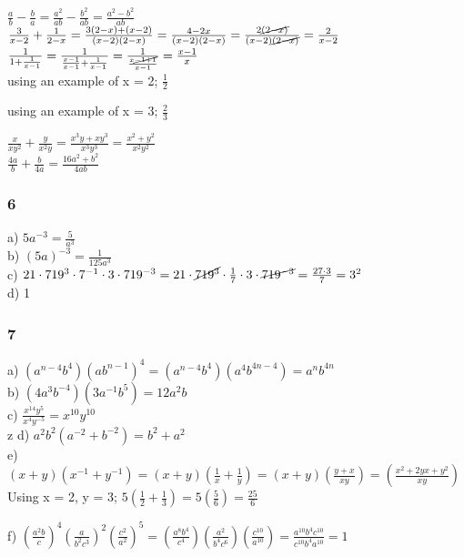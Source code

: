 \documentclass[]{report}
\begin{document}
$ \frac{a}{b} - \frac{b}{a} = \frac{a^2}{ab} - \frac{b^2}{ab} = \frac{a^2-b^2}{ab} $\\
$\frac{3}{x - 2}  + \frac{1}{2-x} = \frac{3(2-x) + (x-2)}{(x-2)(2-x)} = \frac{4 - 2x}{(x-2)(2-x)} =\frac{2\cancel{(2 - x)}}{(x-2)\cancel{(2-x)}} = \frac{2}{x-2}$\\


$\frac{1}{1 + \frac{1}{x-1}} = \frac{1}{\frac{x-1}{x-1} + \frac{1}{x-1}} = \frac{1}{\frac{x\cancel{-1+1}}{x-1}} = \frac{x-1}{x}$ \\

using an example of x = 2;
$\frac{1}{2} $ 

using an example of x = 3;
$\frac{2}{3} $ 



$\frac{x}{xy^2} + \frac{y}{x^2y} = \frac{x^3y + xy^3}{x^3y^3} = \frac{x^2 + y^2}{x^2y^2}$ \\
$\frac{4a}{b} + \frac{b}{4a} = \frac{16a^2 + b^2}{4ab}$

\subsubsection{6}

a) $5a^{-3}  =  \frac{5}{a^3}$ \\
b) $(5a)^{-3} = \frac{1}{125a^3}$ \\
c) $21 \cdot 719^3 \cdot 7^{-1} \cdot 3 \cdot 719^{-3} = 21 \cdot \cancel{719^3} \cdot \frac{1}{7} \cdot 3 \cdot \cancel{719^{-3}}  = \frac{27 \cdot 3}{7} = 3^2$ \\
d) 1 \\

\subsubsection{7}
a)  $(a^{n-4}b^4)(ab^{n-1})^4 = (a^{n-4}b^4)(a^4b^{4n -4}) = a^nb^{4n}$ \\
b)  $(4a^3b^{-4})(3a^{-1}b^5) = 12a^2b$ \\
c)  $\frac{x^{14}y^5}{x^4y^{-5}} = x^{10}y^{10}$ \\z
d)  $a^2b^2(a^{-2} + b^{-2}) = b^2 + a^2$ \\
e)  $(x+y)(x^{-1} + y^{-1}) =  (x+y)(\frac{1}{x}+\frac{1}{y}) = (x+y)(\frac{y + x}{xy}) = (\frac{x^2 + 2yx + y^2}{xy})$ \\

Using x = 2, y = 3;
$5 (\frac{1}{2}+\frac{1}{3}) = 5 (\frac{5}{6}) = \frac{25}{6}$

f)  $(\frac{a^2b}{c})^4(\frac{a}{b^2c^3})^2(\frac{c^2}{a^2})^5 = (\frac{a^8b^4}{c^4})(\frac{a^2}{b^4c^6})(\frac{c^{10}}{a^{10}}) = \frac{a^{10}b^4c^{10}}{c^{10}b^4a^{10}} = 1$ \\
\end{document}
